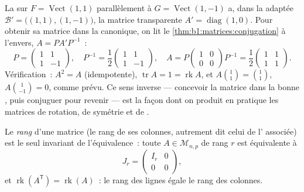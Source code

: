 \begin{example}
\label{ex:b1:matrices:reverserun}
La  sur $F = \operatorname{Vect}(1,1)$ parallèlement à $G =
\operatorname{Vect}(1,-1)$ a, dans la  adaptée $\mathcal
B' = \bigl((1,1),(1,-1)\bigr)$, la matrice transparente $A' =
\operatorname{diag}(1, 0)$. Pour obtenir sa matrice dans la 
canonique, on lit le \cref{thm:b1:matrices:conjugation} à l'envers,
$A = P A' P^{-1}$~:
\[
P = \begin{pmatrix} 1 & 1\\ 1 & -1\end{pmatrix},
\quad
P^{-1} = \frac12\begin{pmatrix} 1 & 1\\ 1 & -1\end{pmatrix},
\quad
A = P\begin{pmatrix} 1 & 0\\ 0 & 0\end{pmatrix}P^{-1}
= \frac12\begin{pmatrix} 1 & 1\\ 1 & 1\end{pmatrix}.
\]
Vérification~: $A^2 = A$ (idempotente), $\operatorname{tr} A = 1 =
\operatorname{rk} A$, et $A\binom{1}{1} = \binom11$,
$A\binom{1}{-1} = 0$, comme prévu. Ce sens inverse --- concevoir la
matrice dans la bonne , puis conjuguer pour revenir --- est la
façon dont on produit en pratique les matrices de rotation, de symétrie
et de .
\end{example}

\begin{theorem}\label{thm:b1:matrices:rank}
Le \emph{rang} d'une matrice (le rang de ses colonnes, autrement dit
celui de l' associée) est le seul invariant de
l'équivalence~: toute $A \in \mathcal{M}_{n,p}$ de rang $r$ est
équivalente à
\[
J_r = \begin{pmatrix} I_r & 0 \\ 0 & 0 \end{pmatrix},
\]
et $\operatorname{rk}(A^{\mathsf T}) = \operatorname{rk}(A)$~: le rang
des lignes égale le rang des colonnes.
\end{theorem}

